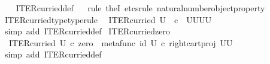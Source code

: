 \begin{isabellebody}
%
\isadelimproof
\ \ %
\endisadelimproof
%
\isatagproof
{}\isamarkupfalse%
\ ITER{\isacharunderscore}{\kern0pt}curried{\isacharunderscore}{\kern0pt}def\isanewline
\ \ \isamarkupfalse%
{\isacharparenleft}{\kern0pt}rule\ theI{\isacharprime}{\kern0pt}{\isacharcomma}{\kern0pt}\ etcs{\isacharunderscore}{\kern0pt}rule\ natural{\isacharunderscore}{\kern0pt}number{\isacharunderscore}{\kern0pt}object{\isacharunderscore}{\kern0pt}property{}{\isacharparenright}{\kern0pt}%
\endisatagproof
{\isafoldproof}%
%
\isadelimproof
\isanewline
%
\endisadelimproof
\ \ \isanewline
{}\isamarkupfalse%
\ ITER{\isacharunderscore}{\kern0pt}curried{\isacharunderscore}{\kern0pt}type{\isacharbrackleft}{\kern0pt}type{\isacharunderscore}{\kern0pt}rule{\isacharbrackright}{\kern0pt}{\isacharcolon}{\kern0pt}\isanewline
\ \ {\isachardoublequoteopen}ITER{\isacharunderscore}{\kern0pt}curried\ U\ {\isacharcolon}{\kern0pt}\ {\isasymnat}\isactrlsub c\ {\isasymrightarrow}\ {\isacharparenleft}{\kern0pt}U\isactrlbsup U\isactrlesup {\isacharparenright}{\kern0pt}\isactrlbsup U\isactrlbsup U\isactrlesup \isactrlesup {\isachardoublequoteclose}\isanewline
%
\isadelimproof
\ \ %
\endisadelimproof
%
\isatagproof
{}\isamarkupfalse%
\ {\isacharparenleft}{\kern0pt}simp\ add{\isacharcolon}{\kern0pt}\ ITER{\isacharunderscore}{\kern0pt}curried{\isacharunderscore}{\kern0pt}def{}{\isacharparenright}{\kern0pt}%
\endisatagproof
{\isafoldproof}%
%
\isadelimproof
\isanewline
%
\endisadelimproof
\isanewline
{}\isamarkupfalse%
\ ITER{\isacharunderscore}{\kern0pt}curried{\isacharunderscore}{\kern0pt}zero{\isacharcolon}{\kern0pt}\ \isanewline
\ \ {\isachardoublequoteopen}ITER{\isacharunderscore}{\kern0pt}curried\ U\ {\isasymcirc}\isactrlsub c\ zero\ {\isacharequal}{\kern0pt}\ {\isacharparenleft}{\kern0pt}metafunc\ {\isacharparenleft}{\kern0pt}id\ U{\isacharparenright}{\kern0pt}\ {\isasymcirc}\isactrlsub c\ {\isacharparenleft}{\kern0pt}right{\isacharunderscore}{\kern0pt}cart{\isacharunderscore}{\kern0pt}proj\ {\isacharparenleft}{\kern0pt}U\isactrlbsup U\isactrlesup {\isacharparenright}{\kern0pt}\ {\isasymone}{\isacharparenright}{\kern0pt}{\isacharparenright}{\kern0pt}\isactrlsup {\isasymsharp}{\isachardoublequoteclose}\isanewline
%
\isadelimproof
\ \ %
\endisadelimproof
%
\isatagproof
{}\isamarkupfalse%
\ {\isacharparenleft}{\kern0pt}simp\ add{\isacharcolon}{\kern0pt}\ ITER{\isacharunderscore}{\kern0pt}curried{\isacharunderscore}{\kern0pt}def{}{\isacharparenright}{\kern0pt}%
\endisatagproof
{\isafoldproof}%

\end{isabellebody}
